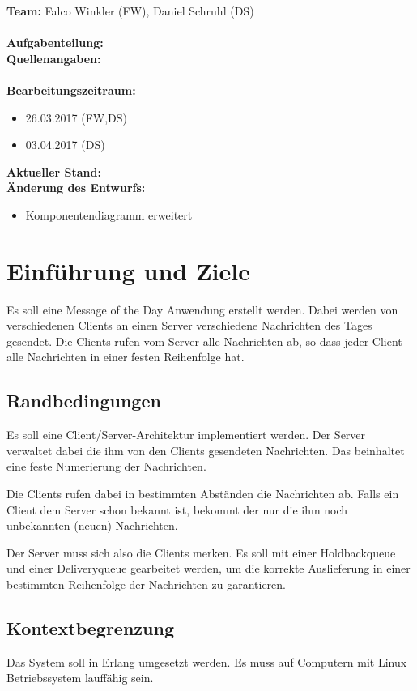 \documentclass{article}
\begin{document}
\textbf{Team:} Falco Winkler (FW), Daniel Schruhl (DS)\\
\\
\textbf{Aufgabenteilung:}\\

\textbf{Quellenangaben:}\\
\\
\textbf{Bearbeitungszeitraum:}
\begin{itemize}
	\item 26.03.2017 (FW,DS)
	\item 03.04.2017 (DS)
\end{itemize}

\textbf{Aktueller Stand:}\\

\textbf{Änderung des Entwurfs:}\\
\begin{itemize}
	\item Komponentendiagramm erweitert
\end{itemize}

\newpage
\tableofcontents 
\newpage

\section{Einführung und Ziele}
Es soll eine Message of the Day Anwendung erstellt werden. Dabei werden von verschiedenen Clients an einen Server verschiedene Nachrichten des Tages gesendet. Die Clients rufen vom Server alle Nachrichten ab, so dass jeder Client alle Nachrichten in einer festen Reihenfolge hat.

\subsection{Randbedingungen}
Es soll eine Client/Server-Architektur implementiert werden.
Der Server verwaltet dabei die ihm von den Clients gesendeten Nachrichten. Das beinhaltet eine feste Numerierung der Nachrichten.

Die Clients rufen dabei in bestimmten Abständen die Nachrichten ab. Falls ein Client dem Server schon bekannt ist, bekommt der nur die ihm noch unbekannten (neuen) Nachrichten.

Der Server muss sich also die Clients merken. Es soll mit einer Holdbackqueue und einer Deliveryqueue gearbeitet werden, um die korrekte Auslieferung in einer bestimmten Reihenfolge der Nachrichten zu garantieren.

\subsection{Kontextbegrenzung}
Das System soll in Erlang umgesetzt werden. Es muss auf Computern mit Linux Betriebssystem lauffähig sein.
\end{document}
